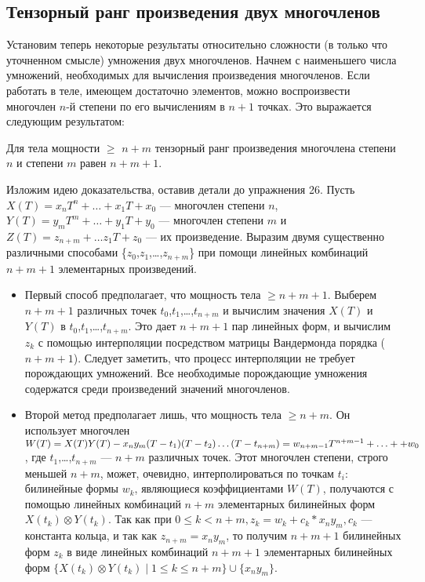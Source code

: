 \documentclass{mai_book}
\begin{document}
\subsection{Тензорный ранг произведения двух многочленов}
Установим теперь некоторые результаты относительно сложности (в только что уточненном смысле) умножения двух многочленов. Начнем с наименьшего числа умножений, необходимых для вычисления произведения многочленов. Если работать в теле, имеющем достаточно элементов, можно воспроизвести многочлен $n$-й степени по его вычислениям в $n + 1$ точках. Это выражается следующим результатом:
\begin{predl}
Для тела мощности $\geqslant$ $n + m$ тензорный ранг произведения многочлена степени $n$ и степени $m$ равен $n + m + 1$.
  \end{predl}
\begin{myproof}
Изложим идею доказательства, оставив детали до упражнения 26. Пусть $X(T) = x_nT^n + \ldots + x_1T + x_0$ --- многочлен степени $n$, $Y(T) = y_mT^m + \ldots + y_1T + y_0$ --- многочлен степени $m$ и $Z(T) = z_{n+m} + \ldots z_1T + z_0$ --- их произведение. Выразим двумя существенно различными способами \{$z_0$,$z_1$,\ldots,$z_{n+m}$\} при помощи линейных комбинаций $n + m + 1$ элементарных произведений.
\begin{itemize}
\item{Первый способ предполагает, что мощность тела $\geqslant n + m + 1$. Выберем $n + m + 1$ различных точек $t_0$,$t_1$,\ldots,$t_{n+m}$ и вычислим значения $X(T)$ и $Y(T)$ в $t_0$,$t_1$,\ldots,$t_{n+m}$. Это дает $n + m + 1$ пар линейных форм, и вычислим $z_k$ с помощью интерполяции посредством матрицы Вандермонда порядка ($n + m + 1$). Следует заметить, что процесс интерполяции не требует порождающих умножений. Все необходимые порождающие умножения содержатся среди произведений значений многочленов.}
\item{Второй метод предполагает лишь, что мощность тела $\geqslant n + m$. Он использует многочлен $W(T) = X(T)Y(T) - x_ny_m(T - t_1)(T - t_2)\ldots(T - t_{n+m}) = w_{n+m-1}T^{n+m-1} + \ldots +\linebreak+w_0$, где $t_1$,\ldots,$t_{n+m}$ --- $n + m$ различных точек. Этот многочлен степени, строго меньшей $n + m$, может, очевидно, интерполироваться по точкам $t_i$: билинейные формы $w_k$, являющиеся коэффициентами $W(T)$, получаются с помощью линейных комбинаций $n + m$ элементарных билинейных форм $X(t_k) \otimes Y(t_k)$. Так как при $0 \leqslant k < n+m, z_k = w_k + c_k * x_ny_m, c_k$ --- константа кольца, и так как $z_{n+m} = x_ny_m$, то получим $n + m + 1$ билинейных форм $z_k$ в виде линейных комбинаций $n + m + 1$ элементарных билинейных форм $\{X(t_k) \otimes Y(t_k) \mid 1 \leqslant k \leqslant n+m\} \cup \{x_ny_m\}$.}
\end{itemize}
\end{myproof}
\end{document}
